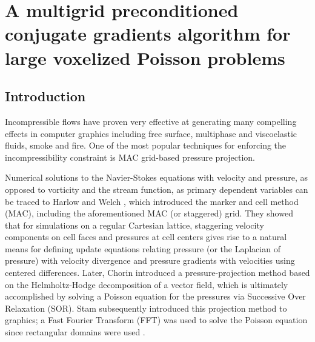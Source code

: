 \chapter{A multigrid preconditioned conjugate gradients algorithm for large voxelized Poisson problems}\label{chap:poisson}


\section{Introduction}
Incompressible flows have proven very effective at generating many
compelling effects in computer graphics including free surface,
multiphase and viscoelastic fluids, smoke and fire. One of the most
popular techniques for enforcing the incompressibility constraint is
MAC grid-based pressure projection. 

Numerical solutions to the
Navier-Stokes equations with velocity and pressure, as opposed to
vorticity and the stream function, as primary dependent variables can
be traced to Harlow and Welch \cite{Harlow:1965:NCO}, which introduced the marker and
cell method (MAC), including the aforementioned MAC (or staggered)
grid.  They showed that for simulations on a regular Cartesian lattice, staggering
velocity components on cell faces and pressures at cell centers gives
rise to a natural means for defining update equations
relating pressure (or the Laplacian of pressure) with velocity
divergence and pressure gradients with velocities using centered
differences.  Later, Chorin \cite{chorin:1968:NS} introduced a
pressure-projection method based on the Helmholtz-Hodge decomposition
of a vector field, which is ultimately accomplished by solving a
Poisson equation for the pressures via Successive Over Relaxation
(SOR).  Stam subsequently introduced this projection method to
graphics; a Fast Fourier Transform (FFT) was used to solve the Poisson
equation since rectangular domains were used \cite{Stam:1999:SF}.

